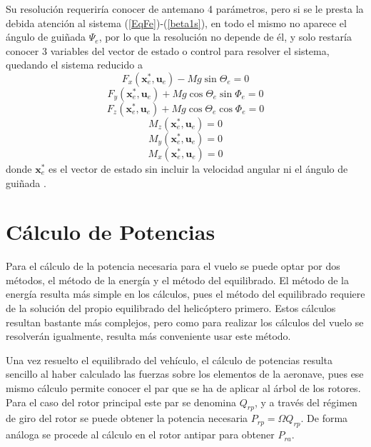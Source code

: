 Su resolución requeriría conocer de antemano 4 parámetros, pero si se le presta la debida atención al sistema (\ref{EqFe})-(\ref{beta1s}), en todo el mismo no aparece el ángulo de guiñada $\Psi_e$, por lo que la resolución no depende de él, y solo restaría conocer 3 variables del vector de estado o control para resolver el sistema, quedando el sistema reducido a
\begin{equation}
	F_x(\mathrm{\textbf{x}}_e^*,\mathrm{\textbf{u}}_e)-Mg\sin\Theta_e=0
\end{equation}
\begin{equation}
	F_y(\mathrm{\textbf{x}}_e^*,\mathrm{\textbf{u}}_e)+Mg\cos\Theta_e\sin\Phi_e=0
\end{equation}
\begin{equation}
	F_z(\mathrm{\textbf{x}}_e^*,\mathrm{\textbf{u}}_e)+Mg\cos\Theta_e\cos\Phi_e=0
\end{equation}
\begin{equation}
	M_z(\mathrm{\textbf{x}}_e^*,\mathrm{\textbf{u}}_e)=0
\end{equation}
\begin{equation}
	M_y(\mathrm{\textbf{x}}_e^*,\mathrm{\textbf{u}}_e)=0
\end{equation}
\begin{equation}
	M_x(\mathrm{\textbf{x}}_e^*,\mathrm{\textbf{u}}_e)=0
\end{equation}
donde $\mathrm{\textbf{x}}_e^*$ es el vector de estado sin incluir la velocidad angular ni el ángulo de guiñada \citep{Cuerva}.

\section{Cálculo de Potencias}

Para el cálculo de la potencia necesaria para el vuelo se puede optar por dos métodos, el método de la energía y el método del equilibrado. El método de la energía resulta más simple en los cálculos, pues el método del equilibrado requiere de la solución del propio equilibrado del helicóptero primero. Estos cálculos resultan bastante más complejos, pero como para realizar los cálculos del vuelo se resolverán igualmente, resulta más conveniente usar este método.

Una vez resuelto el equilibrado del vehículo, el cálculo de potencias resulta sencillo al haber calculado las fuerzas sobre los elementos de la aeronave, pues ese mismo cálculo permite conocer el par que se ha de aplicar al árbol de los rotores. Para el caso del rotor principal este par se denomina $Q_{rp}$, y a través del régimen de giro del rotor se puede obtener la potencia necesaria $P_{rp}=\Omega Q_{rp}$. De forma análoga se procede al cálculo en el rotor antipar para obtener $P_{ra}$.

